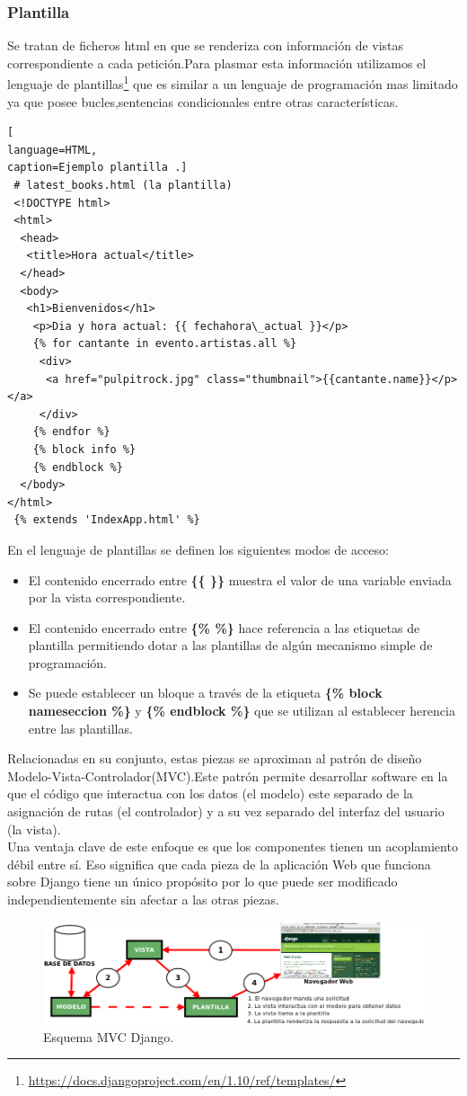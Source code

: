 \subsubsection*{Plantilla}
Se tratan de ficheros html en que se renderiza con información de vistas correspondiente a cada petición.Para plasmar esta información utilizamos el lenguaje de plantillas\footnote{\url{https://docs.djangoproject.com/en/1.10/ref/templates/}} que es similar a un lenguaje de programación mas limitado ya que posee bucles,sentencias condicionales entre otras características.
\begin{lstlisting}[
language=HTML,
caption=Ejemplo plantilla .]
 # latest_books.html (la plantilla)
 <!DOCTYPE html>
 <html>
  <head>
   <title>Hora actual</title>
  </head>
  <body>
   <h1>Bienvenidos</h1>
    <p>Dia y hora actual: {{ fechahora\_actual }}</p>
    {% for cantante in evento.artistas.all %}
     <div>
      <a href="pulpitrock.jpg" class="thumbnail">{{cantante.name}}</p></a>
     </div>
    {% endfor %}
    {% block info %}
    {% endblock %}
  </body>    
</html>
 {% extends 'IndexApp.html' %}
\end{lstlisting}
En el lenguaje de plantillas se definen los siguientes modos de acceso:
\begin{itemize}
\item El contenido encerrado entre \textbf{\{\{ \}\}} muestra el valor de una variable enviada por la vista correspondiente.
\item El contenido encerrado entre \textbf{\{\% \%\}} hace referencia a las etiquetas de plantilla permitiendo dotar a las plantillas de algún mecanismo simple de programación.
\item Se puede establecer un bloque a través de la etiqueta \textbf{\{\% block nameseccion \%\}} y \textbf{\{\% endblock \%\}} que se utilizan al establecer herencia entre las plantillas.
\end{itemize}
Relacionadas en su conjunto, estas piezas se aproximan al patrón de diseño Modelo-Vista-Controlador(MVC).Este patrón permite desarrollar software en la que el código que interactua con los datos (el modelo) este separado de la asignación de rutas (el controlador) y a su vez separado del interfaz del usuario (la vista).
\\Una ventaja clave de este enfoque es que los componentes tienen un acoplamiento débil entre sí. Eso significa que cada pieza de la aplicación Web que funciona sobre Django tiene un único propósito por lo que puede ser modificado independientemente sin afectar a las otras piezas.
\begin{figure}[!h]
\begin{center}
   \includegraphics[width=0.8\linewidth]{Figures/esquemaDjango}
	\decoRule
	\caption[Esquema MVC Django.]{Esquema MVC Django.}
\label{fig:esquemaDjango}
\end{center}
\end{figure}

